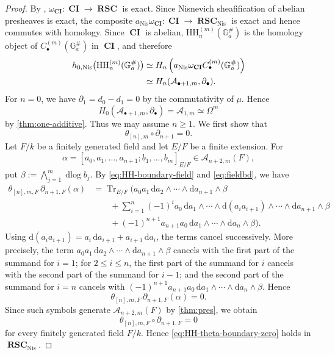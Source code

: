 \documentclass[a4paper,12pt,reqno]{amsart}
\numberwithin{equation}{section}
\theoremstyle{definition}
\DeclareMathOperator{\dlog}{dlog}
\DeclareMathOperator{\Tr}{Tr}
\renewcommand{\d}{\mathrm{d}}
\newcommand{\blue}{\color{blue}}
\newcommand{\black}{\color{black}}
\newcommand{\RSC}{{\operatorname{\mathbf{RSC}}}}
\newcommand{\CI}{\operatorname{\mathbf{CI}}}
\newcommand{\Acal}{\mathcal{A}}
\newcommand{\GaSharp}{\mathbb{G}_{a}^{\#}}
\newcommand{\Nis}{\mathrm{Nis}}
\begin{document}
\begin{proof}
By \cite[Section~3.11, (3.11.1)]{RSY22},
$\omega_{\CI}\colon\CI\to\RSC$ is exact.  Since Nisnevich sheafification of abelian
presheaves is exact, the composite $a_{\Nis}\omega_{\CI}\colon \CI\to \RSC_{\Nis}$ 
is exact and hence commutes with homology.  
Since $\CI$ is abelian, $\mathrm{HH}_n^{(m)}(\GaSharp)$ is the
homology object of $C_\bullet^{(m)}(\GaSharp)$ in $\CI$, and therefore
\begin{align}
 h_{0,\Nis}\bigl(\mathrm{HH}_n^{(m)}(\GaSharp)\bigr)
 &\simeq
 H_n\left(a_{\Nis}\omega_{\CI}C_\bullet^{(m)}(\GaSharp)\right)\notag\\
 &\simeq H_n(\Acal_{\bullet+1,m},\partial_\bullet).
 \label{eq:HH-exactness}
\end{align}
For $n=0$, we have $\partial_1=d_0-d_1=0$
by the commutativity of $\mu$.
Hence
\[
 H_0(\Acal_{\bullet+1,m},\partial_\bullet)
 =\Acal_{1,m}\simeq\Omega^m
\]
by \autoref{thm:one-additive}.
Thus we may assume $n\geq1$.
We first show that 
\begin{equation}\label{eq:HH-theta-boundary-zero}
 \theta_{[n],m}\circ\partial_{n+1}=0.
\end{equation}
Let $F/k$ be a finitely generated field and let $E/F$ be a finite
extension.  For
\[
 \alpha
 =
 [a_0,a_1,\ldots,a_{n+1};b_1,\ldots,b_m]_{E/F}
 \in\Acal_{n+2,m}(F),
\]
put $\beta:=\bigwedge_{j=1}^m\dlog b_j$.
By \eqref{eq:HH-boundary-field} and \eqref{eq:fieldbd}, we have
\begin{align*}
\theta_{[n],m,F}\,\partial_{n+1,F}(\alpha)& =
\Tr_{E/F}\Biggl(
 a_0a_1\,
 \d a_2\wedge\cdots\wedge\d a_{n+1}\wedge\beta\\
&\qquad+
 \sum_{i=1}^{n}(-1)^i
 a_0\,
 \d a_1\wedge\cdots\wedge
 \d(a_i a_{i+1})
 \wedge\cdots\wedge
 \d a_{n+1}\wedge\beta\\
&\qquad+
 (-1)^{n+1}
 a_{n+1}a_0\,
 \d a_1\wedge\cdots\wedge\d a_n\wedge\beta
 \Biggr).
\end{align*}
Using $ \d(a_i a_{i+1})=a_i\,\d a_{i+1}+a_{i+1}\,\d a_i$, 
the terms cancel successively.  More precisely, the term
$a_0a_1\,
 \d a_2\wedge\cdots\wedge\d a_{n+1}\wedge\beta$ 
cancels with the first part of the summand for $i=1$; for
$2\leq i\leq n$, the first part of the summand for $i$ cancels with
the second part of the summand for $i-1$; and the second part of the
summand for $i=n$ cancels with $ (-1)^{n+1}a_{n+1}a_0\,\d a_1\wedge\cdots\wedge\d a_n\wedge\beta$. 
Hence
\[
 \theta_{[n],m,F}\,\partial_{n+1,F}(\alpha)=0.
\]
Since such symbols generate $\Acal_{n+2,m}(F)$ by
\autoref{thm:pres}, we obtain
\[
 \theta_{[n],m,F}\circ\partial_{n+1,F}=0
\]
for every finitely generated field $F/k$.  Hence
\eqref{eq:HH-theta-boundary-zero} holds in $\RSC_{\Nis}$.


\end{proof}
\end{document}
